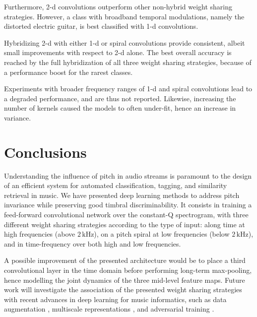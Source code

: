 \documentclass{article}
\begin{document}
Furthermore, 2-d convolutions outperform other non-hybrid
weight sharing strategies. However, a class with broadband
temporal modulations, namely the distorted electric guitar, is best classified
with 1-d convolutions.

Hybridizing 2-d with either 1-d or spiral convolutions provide consistent, albeit
small improvements with respect to 2-d alone. The best overall accuracy is reached
by the full hybridization of all three weight sharing strategies, because of a performance boost for the rarest classes.

Experiments with broader frequency ranges of 1-d and spiral convolutions lead to a degraded performance, and are thus not reported.
Likewise, increasing the number of kernels caused the models to often under-fit,
hence an increase in variance.


\section{Conclusions}
Understanding the influence of pitch in audio streams is paramount to the design of
an efficient system for automated classification, tagging, and similarity retrieval in music. 
We have presented deep learning methods to address pitch invariance
while preserving good timbral discriminability.
It consists in training a feed-forward convolutional network over the constant-Q spectrogram,
with three different weight sharing strategies according to the type of input:
along time at high frequencies (above $2\,\mathrm{kHz}$),
on a pitch spiral at low frequencies (below $2\,\mathrm{kHz}$),
and in time-frequency over both high and low frequencies.

A possible improvement of the presented architecture would be to
place a third convolutional layer in the time domain before performing long-term
max-pooling, hence modelling the joint dynamics of the three mid-level feature maps.
Future work will investigate the association of the presented weight sharing strategies
with recent advances in deep learning for music informatics,
such as data augmentation \cite{McFee2015-muda},
multiscale representations \cite{Hamel2012, Anden2015},
and adversarial training \cite{Kereliuk2015}.


\end{document}
